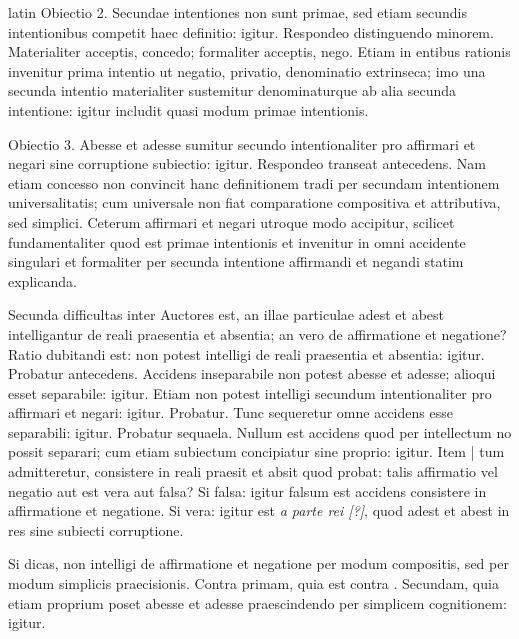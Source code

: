 \begin{otherlanguage*}{latin}
\pstart
Obiectio 2. Secundae intentiones non sunt primae, sed etiam secundis intentionibus competit haec definitio:
igitur. Respondeo distinguendo minorem. Materialiter acceptis, concedo; formaliter acceptis, nego. Etiam in entibus rationis invenitur prima intentio ut negatio, privatio, denominatio extrinseca; imo una secunda intentio materialiter sustemitur denominaturque ab alia secunda intentione:
igitur includit quasi modum primae intentionis. 
\pend

\pstart
Obiectio 3. Abesse et adesse sumitur secundo intentionaliter pro affirmari et negari sine corruptione subiectio:
igitur. Respondeo transeat antecedens. Nam etiam concesso non convincit hanc definitionem tradi per secundam intentionem universalitatis; cum universale non fiat comparatione compositiva et attributiva, sed simplici. Ceterum affirmari et negari utroque modo accipitur, scilicet fundamentaliter quod est primae intentionis et invenitur in omni accidente singulari et formaliter per secunda intentione affirmandi et negandi statim explicanda. 
\pend

\pstart
Secunda difficultas inter Auctores est, an illae particulae adest et abest intelligantur de reali praesentia et absentia; an vero de affirmatione et negatione? Ratio dubitandi est:
non potest intelligi de reali praesentia et absentia:
igitur. Probatur antecedens. Accidens inseparabile non potest abesse et adesse; alioqui esset separabile:
igitur. Etiam non potest intelligi secundum intentionaliter pro affirmari et negari:
igitur. Probatur. Tunc sequeretur omne accidens esse separabili:
igitur. Probatur sequaela. Nullum est accidens quod per intellectum no possit separari; cum etiam subiectum concipiatur sine proprio:
igitur. Item \textnormal{|} tum admitteretur, consistere in reali praesit et absit quod probat:
talis affirmatio vel negatio aut est vera aut falsa? Si falsa:
igitur falsum est accidens consistere in affirmatione et negatione. Si vera:
igitur est \emph{a parte rei [?]}, quod adest et abest in res sine subiecti corruptione. 
\pend

\pstart
Si dicas, non intelligi de affirmatione et negatione per modum compositis, sed per modum simplicis praecisionis. Contra primam, quia est contra . Secundam, quia etiam proprium poset abesse et adesse praescindendo per simplicem cognitionem:
igitur. 
\pend


\end{otherlanguage*}
